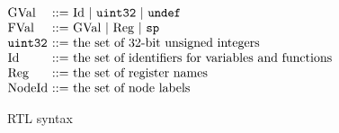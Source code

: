 \begin{figure}[t]
\[\]
\vspace{-1ex}
\[
\begin{array}{@{}l@{~}c@{~}l@{~~}lr@{}}
\rtlGVal&::=&\multicolumn{2}{@{}l@{}}{\rtlId ~|~ \usize ~|~ \rtlundef}\\
\rtlFVal&::=&\multicolumn{2}{@{}l@{}}{\rtlGVal ~|~ \rtlReg ~|~ \rtlsp}\\
  \usize&::=&\multicolumn{2}{@{}l@{}}{\text{the set of 32-bit unsigned integers}}\\
\rtlId&::=&\multicolumn{2}{@{}l@{}}{\text{the set of identifiers for variables and functions \qquad\qquad\qquad}}\\
\rtlReg&::=&\multicolumn{2}{@{}l@{}}{\text{the set of register names}}\\
\rtlNId&::=&\multicolumn{2}{@{}l@{}}{\text{the set of node labels}}\\
\end{array}
\]
\caption{RTL syntax}
\label{fig:rtl-syntax}
\end{figure}


